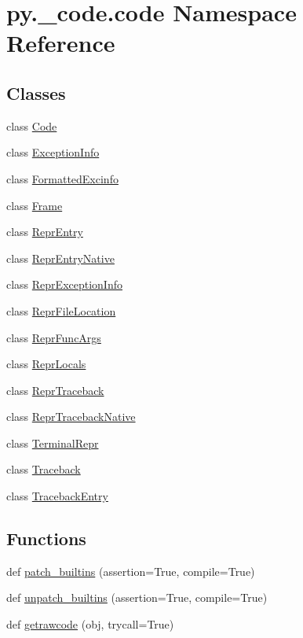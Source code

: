 \hypertarget{namespacepy_1_1__code_1_1code}{}\section{py.\+\_\+code.\+code Namespace Reference}
\label{namespacepy_1_1__code_1_1code}
\subsection*{Classes}
\begin{DoxyCompactItemize}
\item 
class \hyperlink{classpy_1_1__code_1_1code_1_1_code}{Code}
\item 
class \hyperlink{classpy_1_1__code_1_1code_1_1_exception_info}{Exception\+Info}
\item 
class \hyperlink{classpy_1_1__code_1_1code_1_1_formatted_excinfo}{Formatted\+Excinfo}
\item 
class \hyperlink{classpy_1_1__code_1_1code_1_1_frame}{Frame}
\item 
class \hyperlink{classpy_1_1__code_1_1code_1_1_repr_entry}{Repr\+Entry}
\item 
class \hyperlink{classpy_1_1__code_1_1code_1_1_repr_entry_native}{Repr\+Entry\+Native}
\item 
class \hyperlink{classpy_1_1__code_1_1code_1_1_repr_exception_info}{Repr\+Exception\+Info}
\item 
class \hyperlink{classpy_1_1__code_1_1code_1_1_repr_file_location}{Repr\+File\+Location}
\item 
class \hyperlink{classpy_1_1__code_1_1code_1_1_repr_func_args}{Repr\+Func\+Args}
\item 
class \hyperlink{classpy_1_1__code_1_1code_1_1_repr_locals}{Repr\+Locals}
\item 
class \hyperlink{classpy_1_1__code_1_1code_1_1_repr_traceback}{Repr\+Traceback}
\item 
class \hyperlink{classpy_1_1__code_1_1code_1_1_repr_traceback_native}{Repr\+Traceback\+Native}
\item 
class \hyperlink{classpy_1_1__code_1_1code_1_1_terminal_repr}{Terminal\+Repr}
\item 
class \hyperlink{classpy_1_1__code_1_1code_1_1_traceback}{Traceback}
\item 
class \hyperlink{classpy_1_1__code_1_1code_1_1_traceback_entry}{Traceback\+Entry}
\end{DoxyCompactItemize}
\subsection*{Functions}
\begin{DoxyCompactItemize}
\item 
def \hyperlink{namespacepy_1_1__code_1_1code_af43bd7196e3fba2c867062cd9e55f81d}{patch\+\_\+builtins} (assertion=True, compile=True)
\item 
def \hyperlink{namespacepy_1_1__code_1_1code_adda6031c220f85d45eaaf9066e69157b}{unpatch\+\_\+builtins} (assertion=True, compile=True)
\item 
def \hyperlink{namespacepy_1_1__code_1_1code_a3449e9c1a814b60ade9be91f59b524ca}{getrawcode} (obj, trycall=True)
\end{DoxyCompactItemize}
